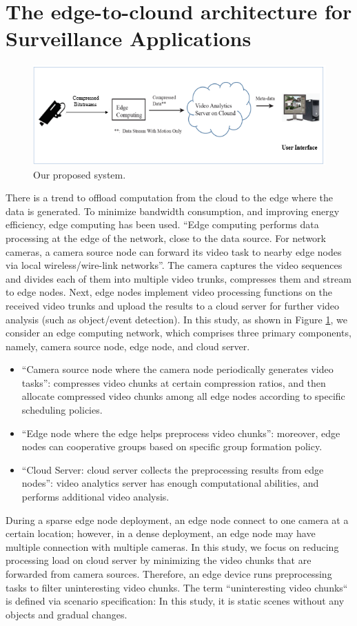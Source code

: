 \section{The edge-to-clound architecture for Surveillance Applications}
\begin{figure}
\centering
 \includegraphics[width=1.0\linewidth]{Figures/arch.png}
 \caption{ Our proposed system.}
 \label{fig:arch}
\end{figure}
There is a trend to offload computation from the cloud to the edge where the data is generated. To minimize bandwidth consumption, and improving energy efficiency, edge computing has been used. “Edge computing performs data processing at the edge of the network, close to the data source. For network cameras, a camera source node can forward its video task to nearby edge nodes via local wireless/wire-link networks”. The camera captures the video sequences and divides each of them into multiple video trunks, compresses them and stream to edge nodes. Next, edge nodes implement video processing functions on the received video trunks and upload the results to a cloud server for further video analysis (such as object/event detection). In this study, as shown in Figure \ref{fig:arch}, we consider an edge computing network, which comprises three primary components, namely, camera source node, edge node, and cloud server.
\begin{itemize}
\item “Camera source node where the camera node periodically generates video tasks”: compresses video chunks at certain compression ratios, and then allocate compressed video chunks among all edge nodes according to specific scheduling policies.
\item “Edge node where the edge helps preprocess video chunks”: moreover, edge nodes can cooperative groups based on specific group formation policy.
\item “Cloud Server: cloud server collects the preprocessing results from edge nodes”: video analytics server has enough computational abilities, and performs additional video analysis.
\end{itemize}
During a sparse edge node deployment, an edge node  connect to one camera  at a certain location; however, in a dense deployment, an edge node may have multiple connection with multiple cameras. In this study, we focus on reducing processing load on cloud server by minimizing the video chunks that are forwarded from camera sources. Therefore, an edge device runs preprocessing tasks to filter uninteresting video chunks. The term “uninteresting video chunks“ is defined via scenario specification: In this study, it is static scenes without any objects and gradual changes.

